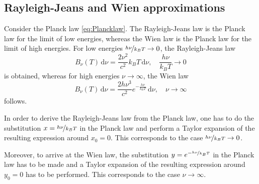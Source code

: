 \documentclass[a4paper,11pt]{report}
\begin{document}
\subsection{Rayleigh-Jeans and Wien approximations}
Consider the Planck law \cref{eq:Plancklaw}. The Rayleigh-Jeans law is the Planck law for the limit of low energies, whereas the Wien law is the Planck law for the limit of high energies. For low energies $\nicefrac{h\nu}{k_BT} \rightarrow 0$, the Rayleigh-Jeans law \begin{equation}\label{eq:RayleighJeanslaw}
B_\nu(T)\,\mathrm{d}\nu = \frac{2\nu^2}{c^2}k_BT\,\mathrm{d}\nu, \quad \frac{h\nu}{k_B T} \rightarrow 0
\end{equation} is obtained, whereas for high energies $\nu \rightarrow \infty$, the Wien law \begin{equation}\label{eq:Wienlaw}
    B_\nu(T)\,\mathrm{d}\nu = \frac{2h\nu^3}{c^2}e^{-\frac{h\nu}{k_BT}}\,\mathrm{d}\nu, \quad \nu \rightarrow \infty
\end{equation} follows. 

In order to derive the Rayleigh-Jeans law from the Planck law, one has to do the substitution $x = \nicefrac{h\nu}{k_BT}$ in the Planck law and perform a Taylor expansion of the resulting expression around $x_0 = 0$. This corresponds to the case $\nicefrac{h\nu}{k_BT} \rightarrow 0$. 

Moreover, to arrive at the Wien law, the substitution $y = e^{-\nicefrac{h\nu}{k_BT}}$ in the Planck law has to be made and a Taylor expansion of the resulting expression around $y_0 =0$ has to be performed. This corresponds to the case $\nu \rightarrow \infty$.
\end{document}
